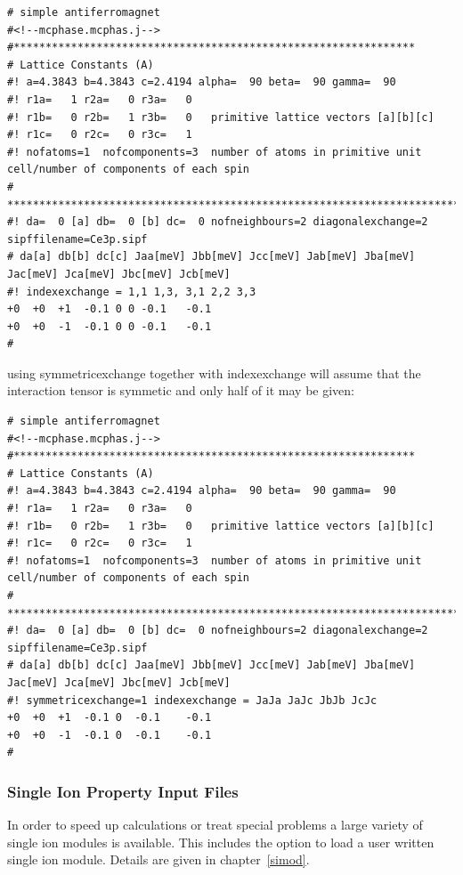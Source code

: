 {\small
\begin{verbatim} 
# simple antiferromagnet 
#<!--mcphase.mcphas.j-->
#***************************************************************
# Lattice Constants (A)
#! a=4.3843 b=4.3843 c=2.4194 alpha=  90 beta=  90 gamma=  90
#! r1a=   1 r2a=   0 r3a=   0
#! r1b=   0 r2b=   1 r3b=   0   primitive lattice vectors [a][b][c]
#! r1c=   0 r2c=   0 r3c=   1
#! nofatoms=1  nofcomponents=3  number of atoms in primitive unit cell/number of components of each spin
# ****************************************************************************
#! da=  0 [a] db=  0 [b] dc=  0 nofneighbours=2 diagonalexchange=2 sipffilename=Ce3p.sipf
# da[a] db[b] dc[c] Jaa[meV] Jbb[meV] Jcc[meV] Jab[meV] Jba[meV] Jac[meV] Jca[meV] Jbc[meV] Jcb[meV]
#! indexexchange = 1,1 1,3, 3,1 2,2 3,3
+0	+0	+1	-0.1 0 0 -0.1	-0.1  
+0	+0	-1	-0.1 0 0 -0.1	-0.1  
#\end{verbatim}
}


using symmetricexchange together with indexexchange will assume that the interaction tensor is symmetic and 
only half of it may be given:

{\small
\begin{verbatim} 
# simple antiferromagnet 
#<!--mcphase.mcphas.j-->
#***************************************************************
# Lattice Constants (A)
#! a=4.3843 b=4.3843 c=2.4194 alpha=  90 beta=  90 gamma=  90
#! r1a=   1 r2a=   0 r3a=   0
#! r1b=   0 r2b=   1 r3b=   0   primitive lattice vectors [a][b][c]
#! r1c=   0 r2c=   0 r3c=   1
#! nofatoms=1  nofcomponents=3  number of atoms in primitive unit cell/number of components of each spin
# ****************************************************************************
#! da=  0 [a] db=  0 [b] dc=  0 nofneighbours=2 diagonalexchange=2 sipffilename=Ce3p.sipf
# da[a] db[b] dc[c] Jaa[meV] Jbb[meV] Jcc[meV] Jab[meV] Jba[meV] Jac[meV] Jca[meV] Jbc[meV] Jcb[meV]
#! symmetricexchange=1 indexexchange = JaJa JaJc JbJb JcJc
+0	+0	+1	-0.1 0  -0.1	-0.1  
+0	+0	-1	-0.1 0  -0.1	-0.1  
#\end{verbatim}
}


\subsubsection{Single Ion Property Input Files}\label{sifile}

In order to speed up calculations or treat special problems a large 
variety of single ion modules is available. This includes the
option to load a user written single ion module. Details are 
given in chapter~\ref{simod}.

